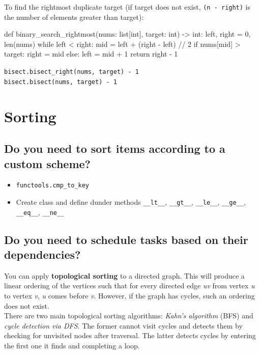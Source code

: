 \documentclass[12pt, titlepage]{article}
\begin{document}
To find the rightmost duplicate target (if target does not exist, \texttt{(n - right)} is the number of elements greater than target):
\begin{python}
def binary_search_rightmost(nums: list[int], target: int) -> int:
    left, right = 0, len(nums)
    while left < right:
        mid = left + (right - left) // 2
        if nums[mid] > target:
            right = mid
        else:
            left = mid + 1
    return right - 1
\end{python}
\texttt{bisect.bisect\_right(nums, target) - 1} \\
\texttt{bisect.bisect(nums, target) - 1}

\section{Sorting}

\subsection{Do you need to sort items according to a custom scheme?}
\begin{itemize}
  \item \texttt{functools.cmp\_to\_key} 
  \item Create class and define dunder methods \texttt{\_\_lt\_\_}, \texttt{\_\_gt\_\_}, \texttt{\_\_le\_\_}, \texttt{\_\_ge\_\_}, \texttt{\_\_eq\_\_}, \texttt{\_\_ne\_\_}
\end{itemize}
\bigskip

\subsection{Do you need to schedule tasks based on their dependencies?}

You can apply \textbf{topological sorting} to a directed graph. This will produce a linear ordering of the vertices such that for every directed edge \textit{uv} from vertex \textit{u} to vertex \textit{v}, \textit{u} comes before \textit{v}. However, if the graph has cycles, such an ordering does not exist.\medskip\\

There are two main topological sorting algorithms: \textit{Kahn's algorithm} (BFS) and \textit{cycle detection via DFS}. The former cannot visit cycles and detects them by checking for unvisited nodes after traversal. The latter detects cycles by entering the first one it finds and completing a loop.\\
\end{document}
